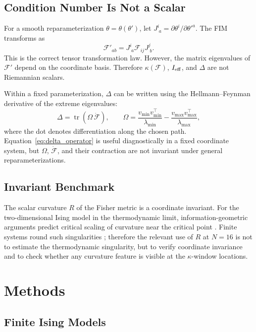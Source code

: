 \documentclass[11pt,a4paper]{article}
\begin{document}
\subsection{Condition Number Is Not a Scalar}

For a smooth reparameterization $\theta=\theta(\theta')$, let $J^i_{\;a}=\partial\theta^i/\partial\theta'^a$.  The FIM transforms as
\begin{equation}
\mathcal F'_{ab}=J^i_{\;a}\mathcal F_{ij}J^j_{\;b}.
\end{equation}
This is the correct tensor transformation law.  However, the matrix eigenvalues of $\mathcal F'$ depend on the coordinate basis.  Therefore $\kappa(\mathcal F)$, $I_{\rm eff}$, and $\Delta$ are not Riemannian scalars.

Within a fixed parameterization, $\Delta$ can be written using the Hellmann--Feynman derivative of the extreme eigenvalues:
\begin{equation}
\Delta
=\operatorname{tr}(\Omega\,\dot{\mathcal F}),\qquad
\Omega=\frac{v_{\min}v_{\min}^{\top}}{\lambda_{\min}}
-\frac{v_{\max}v_{\max}^{\top}}{\lambda_{\max}},
\label{eq:delta_operator}
\end{equation}
where the dot denotes differentiation along the chosen path.  Equation~\eqref{eq:delta_operator} is useful diagnostically in a fixed coordinate system, but $\Omega$, $\dot{\mathcal F}$, and their contraction are not invariant under general reparameterizations.

\subsection{Invariant Benchmark}

The scalar curvature $R$ of the Fisher metric is a coordinate invariant.  For the two-dimensional Ising model in the thermodynamic limit, information-geometric arguments predict critical scaling of curvature near the critical point \citep{janke2004information}.  Finite systems round such singularities \citep{brody2003information}; therefore the relevant use of $R$ at $N=16$ is not to estimate the thermodynamic singularity, but to verify coordinate invariance and to check whether any curvature feature is visible at the $\kappa$-window locations.

\section{Methods}
\label{sec:methods}

\subsection{Finite Ising Models}
\end{document}
